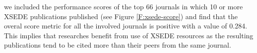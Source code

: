 \documentclass[10pt, conference, compsocconf]{IEEEtran}
\begin{document}

we included the performance scores of the top 66 journals in which 10 or more XSEDE publications published (see Figure \ref{F:xsede-score}) and find that the overal score metric for all the involved journals is positive with a value of 0.284. This implies that researches benefit from use of XSEDE resources as the resulting publications tend to be cited more than their peers from the same journal.
\end{document}
